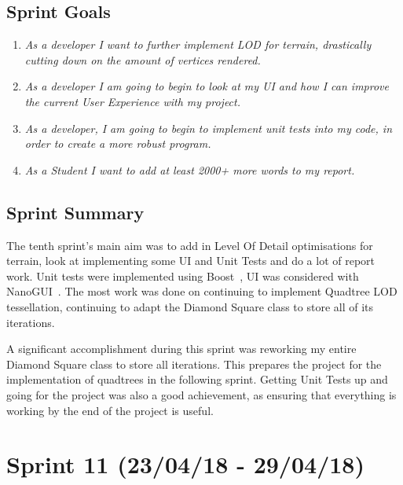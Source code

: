 \documentclass[a4paper,10pt]{report}
\begin{document}
\subsection{Sprint Goals}

\begin{enumerate}

    \item \textit{As a developer I want to further implement LOD for terrain, drastically cutting down on the amount of vertices rendered.}

    \item \textit{As a developer I am going to begin to look at my UI and how I can improve the current User Experience with my project.}

    \item \textit{As a developer, I am going to begin to implement unit tests into my code, in order to create a more robust program. }
    \item \textit{As a Student I want to add at least 2000+ more words to my report.}

\end{enumerate}

\subsection{Sprint Summary}

The tenth sprint's main aim was to add in Level Of Detail optimisations for terrain, look at implementing some UI and Unit Tests and do a lot of report work. Unit tests were implemented using Boost~\cite{boost}, UI was considered with NanoGUI~\cite{nanogui}. The most work was done on continuing to implement Quadtree LOD tessellation, continuing to adapt the Diamond Square class to store all of its iterations. \medskip

A significant accomplishment during this sprint was reworking my entire Diamond Square class to store all iterations. This prepares the project for the implementation of quadtrees in the following sprint. Getting Unit Tests up and going for the project was also a good achievement, as ensuring that everything is working by the end of the project is useful.


\clearpage
\section{Sprint 11 (23/04/18 -  29/04/18)}
\end{document}
